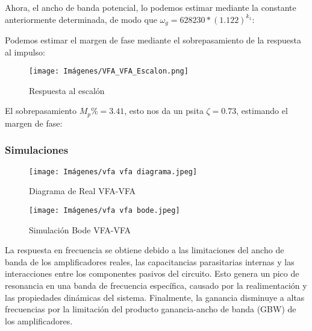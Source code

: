Ahora, el ancho de banda potencial, lo podemos estimar mediante la constante anteriormente determinada, de modo que $\omega_g = 628230*(1.122)^{k_{1}}$:\\

\begin{center}
\end{center}

Podemos estimar el margen de fase mediante el sobrepasamiento de la respuesta al impulso:

\begin{figure}[ht]
    \centering
    \texttt{[image: Imágenes/VFA\_VFA\_Escalon.png]}
    \caption{Respuesta al escalón}
\end{figure}


El sobrepasamiento $M_p\% = 3.41$, esto nos da un psita $\zeta = 0.73$, estimando el margen de fase:

\begin{center}
\end{center}

\newpage

\subsubsection{Simulaciones}
\begin{figure}[H]
    \centering
    \begin{minipage}{0.48\textwidth}
        \centering
        \texttt{[image: Imágenes/vfa vfa diagrama.jpeg]}
        \caption{Diagrama de Real VFA-VFA}
        \label{fig:diagrama_vos}
    \end{minipage}
    \hfill
    \begin{minipage}{0.48\textwidth}
        \centering
        \texttt{[image: Imágenes/vfa vfa bode.jpeg]}
        \caption{Simulación Bode VFA-VFA}
        \label{fig:simu_vos}
    \end{minipage}
\end{figure}

La respuesta en frecuencia se obtiene debido a las limitaciones del ancho de banda de los amplificadores reales, las capacitancias parasitarias internas y las interacciones entre los componentes pasivos del circuito. Esto genera un pico de resonancia en una banda de frecuencia específica, causado por la realimentación y las propiedades dinámicas del sistema. Finalmente, la ganancia disminuye a altas frecuencias por la limitación del producto ganancia-ancho de banda (GBW) de los amplificadores.


